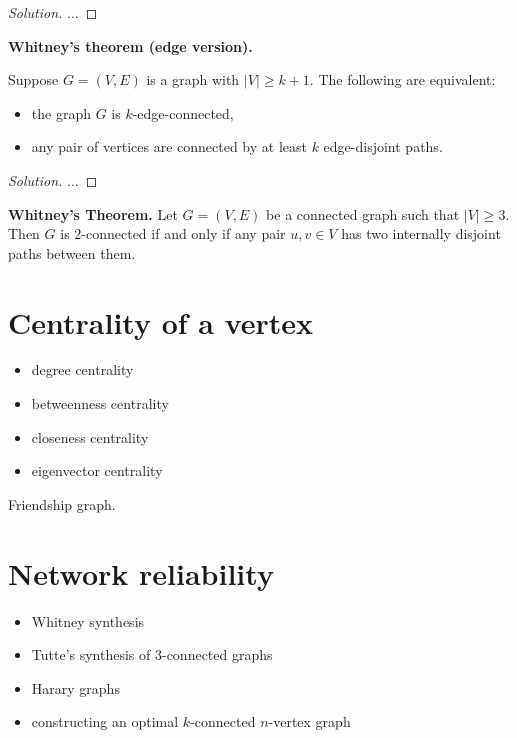 \begin{proof}[Solution]

...

\end{proof}



\begin{theorem}
\textbf{Whitney's theorem (edge version).}
{\rm
Suppose $G=(V,E)$ is a graph with $|V|\geq k+1$. The following are
equivalent:
\begin{itemize}
\item
the graph $G$ is $k$-edge-connected,

\item
any pair of
vertices are connected by at least $k$ edge-disjoint paths.
\end{itemize}
}
\end{theorem}

\begin{proof}[Solution]

...

\end{proof}


\begin{theorem}
\textbf{Whitney's Theorem.}
Let $G = (V, E)$ be a connected graph such that $|V| \geq 3$. Then $G$
is $2$-connected if and only if any pair $u,v \in V$ has two
internally disjoint paths between them.
\end{theorem}



\section{Centrality of a vertex}

\begin{itemize}
\item degree centrality

\item betweenness centrality

\item closeness centrality

\item eigenvector centrality
\end{itemize}

\begin{algorithm}[!htbp]

\caption{Friendship graph.}
\label{alg:distance_connectivity:friendship_graphs}
\end{algorithm}



\section{Network reliability}

\begin{itemize}
\item Whitney synthesis

\item Tutte's synthesis of $3$-connected graphs

\item Harary graphs

\item constructing an optimal $k$-connected $n$-vertex graph
\end{itemize}
